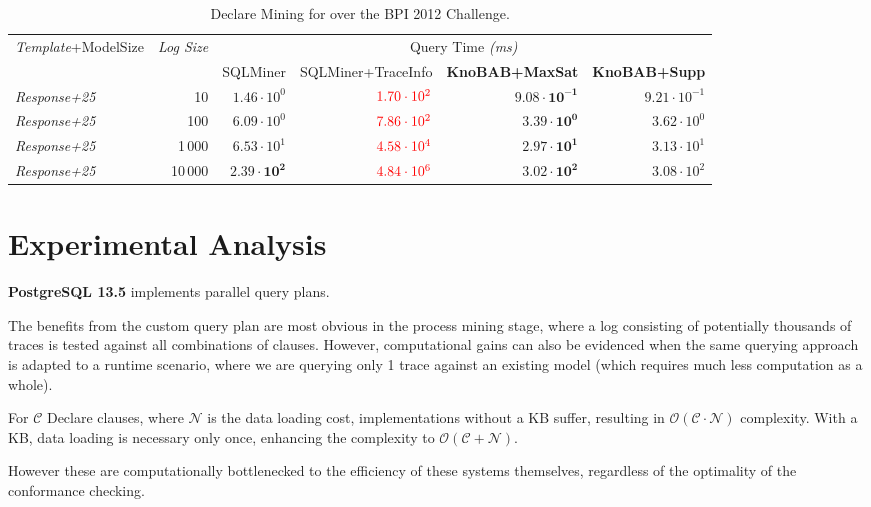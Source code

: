 \begin{table}
	\caption{Declare Mining for  over the BPI 2012 Challenge. }
	\centering
	\resizebox{\textwidth}{!}
	{\begin{tabular}{lr|rr|rr}
			\toprule
			\multirow{2}{*}{\textit{Template}+ModelSize} & \multirow{2}{*}{\textit{Log Size}} & \multicolumn{4}{c}{Query Time \textit{(ms)}} \\ 
		&	& \textsf{SQLMiner} & \textsf{SQLMiner+TraceInfo} & \textbf{KnoBAB+MaxSat}& \textbf{KnoBAB+Supp}\\
			\midrule
			\textit{Response+25} & 10 & $1.46\cdot 10^0$ & $\color{red}1.70\cdot 10^2$ & $\mathbf{9.08}\cdot \mathbf{10}^\mathbf{-1}$ & $9.21\cdot 10^{-1}$\\
			\textit{Response+25} & 100 & $6.09\cdot 10^0$ & $\color{red}7.86\cdot 10^2$ & $ \mathbf{3.39}\cdot  \mathbf{10}^ \mathbf{0}$& $3.62\cdot 10^0$\\
			\textit{Response+25} & 1\,000 & $6.53\cdot 10^1$ & $\color{red}4.58\cdot 10^4$ & $ \mathbf{2.97}\cdot  \mathbf{10}^ \mathbf{1}$& $3.13\cdot 10^1$\\
			\textit{Response+25} & 10\,000 & $ \mathbf{2.39}\cdot  \mathbf{10}^ \mathbf{2}$ & $\color{red}4.84\cdot 10^6$ & $\mathbf{3.02}\cdot \mathbf{10}^\mathbf{2}$& $3.08\cdot 10^2$\\
			\bottomrule
	\end{tabular}}
\end{table}


\section{Experimental Analysis}\label{sec:exp}
\textbf{PostgreSQL 13.5} implements parallel query plans.


The benefits from the custom query plan are most obvious in the process mining stage, where a log consisting of potentially thousands of traces is tested against all combinations of clauses. However, computational gains can also be evidenced when the same querying approach is adapted to a runtime scenario, where we are querying only 1 trace against an existing model (which requires much less computation as a whole).

For $\mathcal{C}$ Declare clauses, where $\mathcal{N}$ is the data loading cost, implementations without a KB suffer, resulting in $\mathcal{O(C \cdot N)}$ complexity. With a KB, data loading is necessary only once, enhancing the complexity to $\mathcal{O(C + N)}$.

However these are computationally bottlenecked to the efficiency of these systems themselves, regardless of the optimality of the conformance checking.


